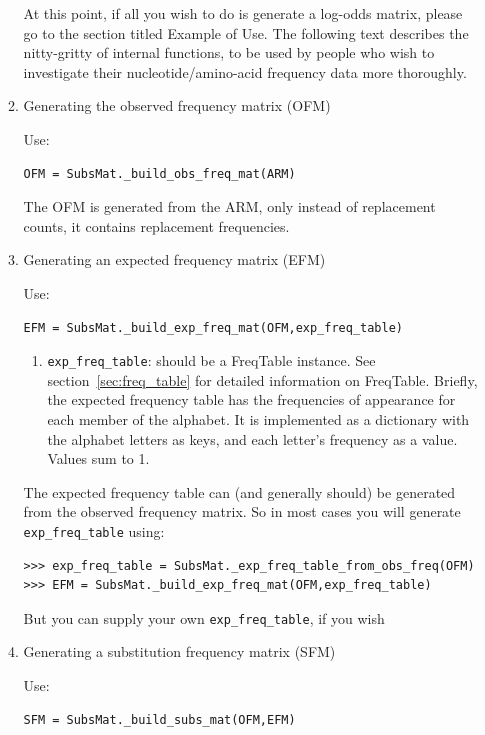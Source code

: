 \documentclass{report}
\begin{document}
\begin{enumerate}
\begin{enumerate}
At this point, if all you wish to do is generate a log-odds matrix, please go to the section titled Example of Use. The following text describes the nitty-gritty of internal functions, to be used by people who wish to investigate their nucleotide/amino-acid frequency data more thoroughly. 

\item Generating the observed frequency matrix (OFM)

Use:
\begin{verbatim}
OFM = SubsMat._build_obs_freq_mat(ARM)
\end{verbatim}

  The OFM is generated from the ARM, only instead of replacement counts, it contains replacement frequencies. 

\item Generating an expected frequency matrix (EFM)

Use:

\begin{verbatim}
EFM = SubsMat._build_exp_freq_mat(OFM,exp_freq_table)
\end{verbatim}

  \begin{enumerate}
    \item \verb|exp_freq_table|: should be a FreqTable instance. See section~\ref{sec:freq_table} for detailed information on FreqTable. Briefly, the expected frequency table has the frequencies of appearance for each member of the alphabet. It is
  implemented as a dictionary with the alphabet letters as keys, and each letter's frequency as a value. Values sum to 1.
  \end{enumerate}
 
The expected frequency table can (and generally should) be generated from the observed frequency matrix. So in most cases you will generate \verb|exp_freq_table| using:

\begin{verbatim}
>>> exp_freq_table = SubsMat._exp_freq_table_from_obs_freq(OFM)
>>> EFM = SubsMat._build_exp_freq_mat(OFM,exp_freq_table)
\end{verbatim}

But you can supply your own \verb|exp_freq_table|, if you wish

\item Generating a substitution frequency matrix (SFM)

Use:

\begin{verbatim}
SFM = SubsMat._build_subs_mat(OFM,EFM)
\end{verbatim}


\end{enumerate}
\end{enumerate}
\end{document}
